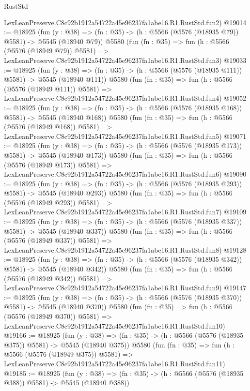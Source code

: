 \begin{lexlean}{RustStd}
\begin{coremodule}
    LexLeanPreserve.C8c92b1912a54722a45e96237fa1abe16.R1.RustStd.fun2)
@19014 := @18925
    (fun (y : @38) => (fn : @35) -> (h : @5566 (@5576 (@18935 @79)) @5581) -> @5545 (@18940 @79))
    @5580
    (fun (fn : @35) =>
    fun (h : @5566 (@5576 (@18949 @79)) @5581) =>
    LexLeanPreserve.C8c92b1912a54722a45e96237fa1abe16.R1.RustStd.fun3)
@19033 := @18925
    (fun (y : @38) => (fn : @35) -> (h : @5566 (@5576 (@18935 @111)) @5581) -> @5545 (@18940 @111))
    @5580
    (fun (fn : @35) =>
    fun (h : @5566 (@5576 (@18949 @111)) @5581) =>
    LexLeanPreserve.C8c92b1912a54722a45e96237fa1abe16.R1.RustStd.fun4)
@19052 := @18925
    (fun (y : @38) => (fn : @35) -> (h : @5566 (@5576 (@18935 @168)) @5581) -> @5545 (@18940 @168))
    @5580
    (fun (fn : @35) =>
    fun (h : @5566 (@5576 (@18949 @168)) @5581) =>
    LexLeanPreserve.C8c92b1912a54722a45e96237fa1abe16.R1.RustStd.fun5)
@19071 := @18925
    (fun (y : @38) => (fn : @35) -> (h : @5566 (@5576 (@18935 @173)) @5581) -> @5545 (@18940 @173))
    @5580
    (fun (fn : @35) =>
    fun (h : @5566 (@5576 (@18949 @173)) @5581) =>
    LexLeanPreserve.C8c92b1912a54722a45e96237fa1abe16.R1.RustStd.fun6)
@19090 := @18925
    (fun (y : @38) => (fn : @35) -> (h : @5566 (@5576 (@18935 @293)) @5581) -> @5545 (@18940 @293))
    @5580
    (fun (fn : @35) =>
    fun (h : @5566 (@5576 (@18949 @293)) @5581) =>
    LexLeanPreserve.C8c92b1912a54722a45e96237fa1abe16.R1.RustStd.fun7)
@19109 := @18925
    (fun (y : @38) => (fn : @35) -> (h : @5566 (@5576 (@18935 @337)) @5581) -> @5545 (@18940 @337))
    @5580
    (fun (fn : @35) =>
    fun (h : @5566 (@5576 (@18949 @337)) @5581) =>
    LexLeanPreserve.C8c92b1912a54722a45e96237fa1abe16.R1.RustStd.fun8)
@19128 := @18925
    (fun (y : @38) => (fn : @35) -> (h : @5566 (@5576 (@18935 @342)) @5581) -> @5545 (@18940 @342))
    @5580
    (fun (fn : @35) =>
    fun (h : @5566 (@5576 (@18949 @342)) @5581) =>
    LexLeanPreserve.C8c92b1912a54722a45e96237fa1abe16.R1.RustStd.fun9)
@19147 := @18925
    (fun (y : @38) => (fn : @35) -> (h : @5566 (@5576 (@18935 @370)) @5581) -> @5545 (@18940 @370))
    @5580
    (fun (fn : @35) =>
    fun (h : @5566 (@5576 (@18949 @370)) @5581) =>
    LexLeanPreserve.C8c92b1912a54722a45e96237fa1abe16.R1.RustStd.fun10)
@19166 := @18925
    (fun (y : @38) => (fn : @35) -> (h : @5566 (@5576 (@18935 @375)) @5581) -> @5545 (@18940 @375))
    @5580
    (fun (fn : @35) =>
    fun (h : @5566 (@5576 (@18949 @375)) @5581) =>
    LexLeanPreserve.C8c92b1912a54722a45e96237fa1abe16.R1.RustStd.fun11)
@19185 := @18925
    (fun (y : @38) => (fn : @35) -> (h : @5566 (@5576 (@18935 @388)) @5581) -> @5545 (@18940 @388))

\end{coremodule}
\end{lexlean}
